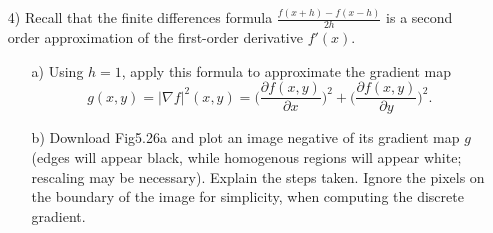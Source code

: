 \documentclass{article}
\begin{document}
\begin{enumerate}
\newpage

\begin{lstlisting}
%Import image
A = im2double(imread('original_image_problem_3.jpg'));

%Hard-code Laplacian filter
laplacian_filter = [-1 -1 -1 ; -1 9 -1 ; -1 -1 -1];

%Create dummy matrix to hold output image
B = zeros(size(A));

%Loop through image
for i = 2:size(A,1)-1
    for j = 2:size(A,2)-1
        
        %Apply filter to pixels
        temp = A(i-1:i+1,j-1:j+1) .* laplacian_filter;
        
        %Store filtered pixels in new matrix
        B(i,j) = sum(temp(:));
    end
end

imshow(B);
\end{lstlisting}

\vspace{0.25in}

{\bf Optional Problem}
\vspace{-0.1in}
\item[4)]Recall that the finite differences formula $\frac{f(x+h)-f(x-h)}{2h}$ is a second order approximation of the first-order derivative $f'(x)$.  
\begin{enumerate}
\item[a)] Using $h=1$, apply this formula to approximate the gradient map 
$$g(x,y)=|\nabla f|^2(x,y)=\Big(\frac{\partial f(x,y)}{\partial x}\Big)^2+\Big(\frac{\partial f(x,y)}{\partial y}\Big)^2.$$ 

\item[b)] Download Fig5.26a and plot an image negative of its gradient map $g$ (edges will appear black, while homogenous regions will appear white; rescaling may be necessary). 
Explain the steps taken. Ignore the pixels on the boundary of the image for simplicity, when computing the discrete gradient. 
\end{enumerate}

\end{enumerate}
\end{document}
